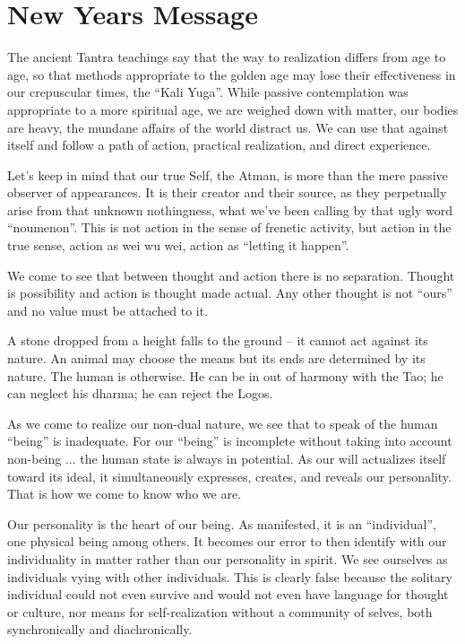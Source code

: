 \section{New Years Message}

The ancient Tantra teachings say that the way to realization differs from age to age, so that methods appropriate to the golden age may lose their effectiveness in our crepuscular times, the ``Kali Yuga''. While passive contemplation was appropriate to a more spiritual age, we are weighed down with matter, our bodies are heavy, the mundane affairs of the world distract us. We can use that against itself and follow a path of action, practical realization, and direct experience.

Let's keep in mind that our true Self, the Atman, is more than the mere passive observer of appearances. It is their creator and their source, as they perpetually arise from that unknown nothingness, what we've been calling by that ugly word ``noumenon''. This is not action in the sense of frenetic activity, but action in the true sense, action as wei wu wei, action as ``letting it happen''.

We come to see that between thought and action there is no separation. Thought is possibility and action is thought made actual. Any other thought is not ``ours'' and no value must be attached to it.

A stone dropped from a height falls to the ground -- it cannot act against its nature. An animal may choose the means but its ends are determined by its nature. The human is otherwise. He can be in out of harmony with the Tao; he can neglect his dharma; he can reject the Logos.

As we come to realize our non-dual nature, we see that to speak of the human ``being'' is inadequate. For our ``being'' is incomplete without taking into account non-being ... the human state is always in potential. As our will actualizes itself toward its ideal, it simultaneously expresses, creates, and reveals our personality. That is how we come to know who we are.

Our personality is the heart of our being. As manifested, it is an ``individual'', one physical being among others. It becomes our error to then identify with our individuality in matter rather than our personality in spirit. We see ourselves as individuals vying with other individuals. This is clearly false because the solitary individual could not even survive and would not even have language for thought or culture, nor means for self-realization without a community of selves, both synchronically and diachronically.

